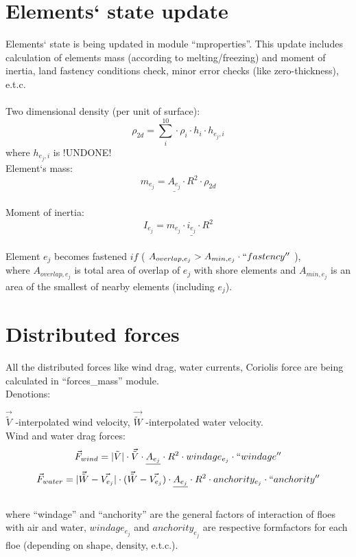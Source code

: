 \section{Elements` state update}

Elements` state is being updated in module ``mproperties''.
This update includes calculation of elements mass (according to 
melting/freezing) and moment of inertia, land fastency conditions check, 
minor error checks (like zero-thickness), e.t.c.
\\
\\
Two dimensional density (per unit of surface):
\begin{equation}
 \rho_{2d} = \sum_{i}^{10} \cdot \rho_i \cdot h_i \cdot h_{e_j,i}
\end{equation}
where $h_{e_j,i}$ is !UNDONE!
\\
Element`s mass:
\begin{equation}
 m_{e_j} = \underline{A_{e_j}} \cdot R^2 \cdot \rho_{2d}
\end{equation}
\\
Moment of inertia:
\begin{equation}
 I_{e_j} = m_{e_j} \cdot \underline{i_{e_j}} \cdot R^2
\end{equation}
\\
Element $e_j$ becomes fastened  $if$ ( $A_{overlap,e_j} > A_{min,e_j} \cdot ``fastency''$ ),
\\ where $A_{overlap,e_j}$ is total 
area of overlap of $e_j$ with shore elements and $A_{min,e_j}$ is an area
of the smallest of nearby elements (including $e_j$).

\section{Distributed forces}

All the distributed forces like wind drag, water currents, Coriolis force
are being calculated in ``forces\_mass'' module.
\\
Denotions:

$\vec{\tilde{V}}$ -interpolated wind velocity, 
$\vec{\tilde{W}}$ -interpolated water velocity.
\\
Wind and water drag forces:
\begin{equation}
 \vec{F}_{wind} = |\tilde{V}|\cdot\vec{\tilde{V}} \cdot \underline{A_{e_j}} \cdot R^2 \cdot windage_{e_j} \cdot ``windage''
\end{equation}
\begin{equation}
 \vec{F}_{water} = |\vec{\tilde{W}} - \vec{V_{e_j}}|\cdot(\vec{\tilde{W}} - \vec{V_{ e_j}}) \cdot \underline{A_{e_j}}
 \cdot R^2 \cdot anchority_{ e_j} \cdot ``anchority''
\end{equation}
\\
where ``windage'' and ``anchority'' are the general factors of interaction of
floes with air and water, $windage_{e_j}$ and $anchority_{ e_j}$ are respective
formfactors for each floe (depending on shape, density, e.t.c.).

